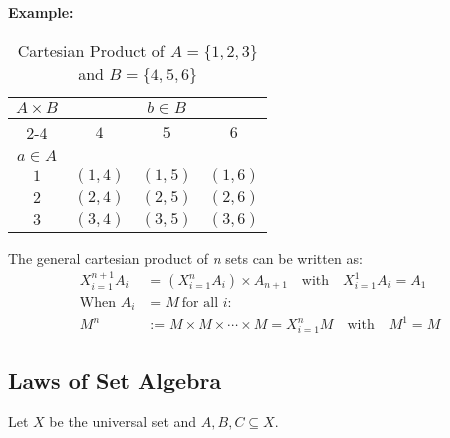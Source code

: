 \textbf{Example:}
\begin{table}[H]
	\centering
	\caption{Cartesian Product of \(A = \{1, 2, 3\}\) and \(B = \{4, 5, 6\}\)}
	\begin{tabular}{|c|c|c|c|}
		\hline
		\multirow{3}{*}{\(A \times B\)} & \multicolumn{3}{c|}{\(b \in B\)}                       \\
		\cline{2-4}
		                              & \(4\)                            & \(5\)      & \(6\)      \\
		\hline
		\(a \in A\)                     &                                &          &          \\
		\hline
		\(1\)                           & \((1, 4)\)                       & \((1, 5)\) & \((1, 6)\) \\
		\hline
		\(2\)                           & \((2, 4)\)                       & \((2, 5)\) & \((2, 6)\) \\
		\hline
		\(3\)                           & \((3, 4)\)                       & \((3, 5)\) & \((3, 6)\) \\
		\hline
	\end{tabular}
	\label{tab:cartesian_product}
\end{table}

The general cartesian product of \emph{n} sets can be written as:
\begin{align*}
	X_{i = 1}^{n + 1} A_i & = \left( X_{i = 1}^{n} A_i \right) \times A_{n + 1} \quad \text{with} \quad X_{i = 1}^{1} A_i = A_1 \\
	\text{When } A_i      & = M \ \text{for all } i:                                                                            \\
	M^n                   & := M \times M \times \cdots \times M = X_{i = 1}^{n} M \quad \text{with} \quad M^1 = M
\end{align*}

\subsection{Laws of Set Algebra}
Let \(X\) be the universal set and \(A, B, C \subseteq X\).

